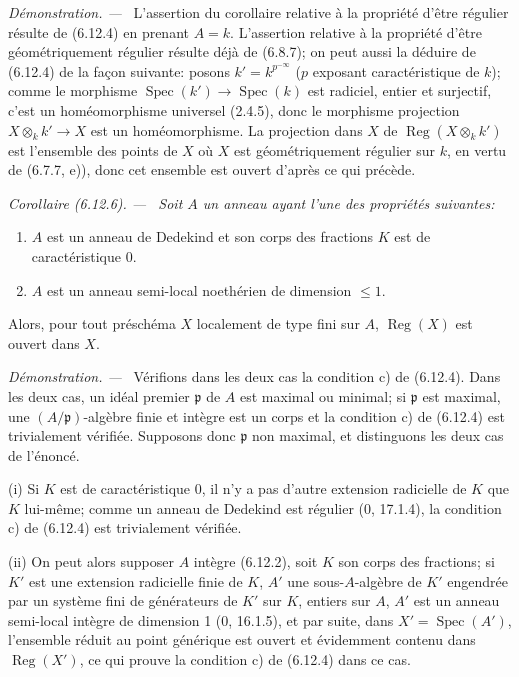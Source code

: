 \documentclass[10pt,oneside]{book}
\newenvironment{corollary}[1][]{%
  \par\medskip\noindent\itshape Corollaire (#1). ---\ }{\par}
\newenvironment{proof}{%
  \par\medskip\noindent\textit{Démonstration. ---\ }}{\par}
\begin{document}
\begin{proof}
L'assertion du corollaire relative à la propriété d'être régulier résulte de
(6.12.4) en prenant $A=k$. L'assertion relative à la propriété d'être
géométriquement régulier résulte déjà de (6.8.7); on peut aussi la déduire de
(6.12.4) de la façon suivante: posons $k'=k^{p^{-\infty}}$ ($p$ exposant
caractéristique de $k$); comme le morphisme
$\operatorname{Spec}(k')\to\operatorname{Spec}(k)$ est radiciel, entier et
surjectif, c'est un homéomorphisme universel (2.4.5), donc le morphisme
projection $X\otimes_kk'\to X$ est un homéomorphisme. La projection dans
$X$ de $\operatorname{Reg}(X\otimes_kk')$ est l'ensemble des points de $X$
où $X$ est géométriquement régulier sur $k$, en vertu de (6.7.7, e)), donc
cet ensemble est ouvert d'après ce qui précède.
\end{proof}

\begin{corollary}[6.12.6]
\label{IV.2.s6.12.6-fr}
Soit $A$ un anneau ayant l'une des propriétés suivantes:
\begin{enumerate}
\item[(i)] $A$ est un anneau de Dedekind et son corps des fractions $K$ est
de caractéristique 0.
\item[(ii)] $A$ est un anneau semi-local noethérien de dimension $\leq1$.
\end{enumerate}
Alors, pour tout préschéma $X$ localement de type fini sur $A$,
$\operatorname{Reg}(X)$ est ouvert dans $X$.
\end{corollary}

\begin{proof}
Vérifions dans les deux cas la condition c) de (6.12.4). Dans les deux cas,
un idéal premier $\mathfrak p$ de $A$ est maximal ou minimal; si
$\mathfrak p$ est maximal, une $(A/\mathfrak p)$-algèbre finie et intègre
est un corps et la condition c) de (6.12.4) est trivialement vérifiée.
Supposons donc $\mathfrak p$ non maximal, et distinguons les deux cas de
l'énoncé.

(i) Si $K$ est de caractéristique 0, il n'y a pas d'autre extension
radicielle de $K$ que $K$ lui-même; comme un anneau de Dedekind est régulier
(0, 17.1.4), la condition c) de (6.12.4) est trivialement vérifiée.

(ii) On peut alors supposer $A$ intègre (6.12.2), soit $K$ son corps des
fractions; si $K'$ est une extension radicielle finie de $K$, $A'$ une
sous-$A$-algèbre de $K'$ engendrée par un système fini de générateurs de
$K'$ sur $K$, entiers sur $A$, $A'$ est un anneau semi-local intègre de
dimension 1 (0, 16.1.5), et par suite, dans
$X'=\operatorname{Spec}(A')$, l'ensemble réduit au point générique est
ouvert et évidemment contenu dans $\operatorname{Reg}(X')$, ce qui prouve
la condition c) de (6.12.4) dans ce cas.
\end{proof}
\end{document}
